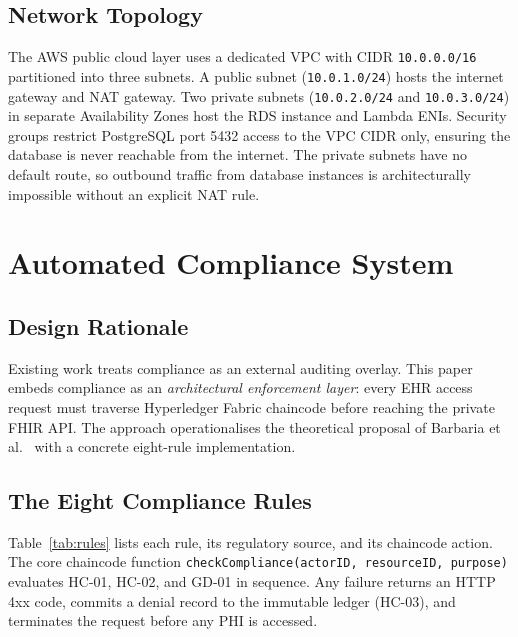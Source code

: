 \documentclass[10pt,twocolumn,a4paper]{article}
\begin{document}
\subsection{Network Topology}

The AWS public cloud layer uses a dedicated VPC with CIDR
\texttt{10.0.0.0/16} partitioned into three subnets. A public subnet
(\texttt{10.0.1.0/24}) hosts the internet gateway and NAT gateway.
Two private subnets (\texttt{10.0.2.0/24} and \texttt{10.0.3.0/24})
in separate Availability Zones host the RDS instance and Lambda ENIs.
Security groups restrict PostgreSQL port 5432 access to the VPC CIDR
only, ensuring the database is never reachable from the internet.
The private subnets have no default route, so outbound traffic from
database instances is architecturally impossible without an explicit
NAT rule.

\section{Automated Compliance System}

\subsection{Design Rationale}

Existing work treats compliance as an external auditing overlay. This
paper embeds compliance as an \textit{architectural enforcement layer}:
every EHR access request must traverse Hyperledger Fabric chaincode
before reaching the private FHIR API. The approach operationalises the
theoretical proposal of Barbaria et al.~\cite{barbaria2025} with a
concrete eight-rule implementation.

\subsection{The Eight Compliance Rules}

Table~\ref{tab:rules} lists each rule, its regulatory source, and its
chaincode action. The core chaincode function
\texttt{checkCompliance(actorID, resourceID, purpose)} evaluates HC-01,
HC-02, and GD-01 in sequence. Any failure returns an HTTP 4xx code,
commits a denial record to the immutable ledger (HC-03), and terminates
the request before any PHI is accessed.
\end{document}
